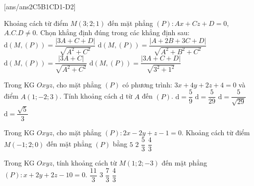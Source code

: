 \TN
{}[ans/ans2C5B1CD1-D2]
\begin{ex}%
	Khoảng cách từ điểm $M\left(3;2;1\right)$ đến mặt phẳng $(P)\colon Ax+Cz+D=0$, $A.C.D\ne 0$. Chọn khẳng định đúng trong các khẳng định sau:
	\choice
	{\True $\mathrm{d}(M,(P))=\dfrac{\left| 3A+C+D\right|}{\sqrt{A^2+C^2}}$}
	{$\mathrm{d}(M,(P))=\dfrac{\left| A+2B+3C+D\right|}{\sqrt{A^2+B^2+C^2}}$}
	{$\mathrm{d}(M,(P))=\dfrac{\left| 3A+C\right|}{\sqrt{A^2+C^2}}$}
	{$\mathrm{d}(M,(P))=\dfrac{\left| 3A+C+D\right|}{\sqrt{3^2+1^2}}$}
\end{ex}

\begin{ex}%
	Trong KG $Oxyz$, cho mặt phẳng $(P)$ có phương trình: $3x+4y+2z+4=0$ và điểm $A(1;-2;3)$. Tính khoảng cách $\mathrm{d}$ từ $A$ đến $(P)$.
	\choice
	{$\mathrm{d}=\dfrac{5}{9}$}
	{$\mathrm{d}=\dfrac{5}{29}$}
	{\True $\mathrm{d}=\dfrac{5}{\sqrt{29}}$}
	{$\mathrm{d}=\dfrac{\sqrt{5}}{3}$}
\end{ex}

\begin{ex}%
	Trong KG $Oxyz$, cho mặt phẳng $(P)\colon 2x-2y+z-1=0$. Khoảng cách từ điểm $M\left(-1;2;0\right)$ đến mặt phẳng $(P)$ bằng
	\choice
	{$5$}
	{$2$}
	{\True $\dfrac{5}{3}$}
	{$\dfrac{4}{3}$}
\end{ex}

\begin{ex}%
	Trong KG $Oxyz$, tính khoảng cách từ $M\left(1;2;-3\right)$ đến mặt phẳng $(P)\colon x+2y+2z-10=0$.
	\choice
	{\True $\dfrac{11}{3}$}
	{$3$}
	{$\dfrac{7}{3}$}
	{$\dfrac{4}{3}$}
\end{ex}

